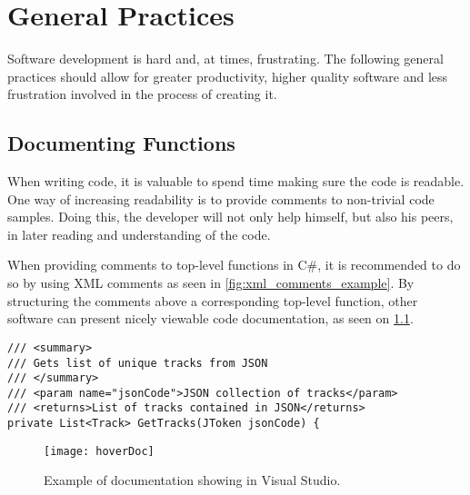 \chapter{General Practices}
\label{imp:general_practices}

Software development is hard and, at times, frustrating. The following
general practices should allow for greater productivity, higher
quality software and less frustration involved in the process of creating it.

\section{Documenting Functions}
When writing code, it is valuable to spend time making sure the
code is readable. One way of increasing readability is to provide comments
to non-trivial code samples. Doing this, the developer will not only
help himself, but also his peers, in later reading and understanding of the code.

When providing comments to top-level functions in C\#, it is
recommended to do so by using XML comments as seen in
\cref{fig:xml_comments_example}. By structuring the comments above a
corresponding top-level function, other software can present nicely
viewable code documentation, as seen on \cref{fig:hoverDoc}.

\begin{lstlisting}[caption = {Example of XML-comments on top of C\# function.}, label={fig:xml_comments_example}]
/// <summary>
/// Gets list of unique tracks from JSON
/// </summary>
/// <param name="jsonCode">JSON collection of tracks</param>
/// <returns>List of tracks contained in JSON</returns>
private List<Track> GetTracks(JToken jsonCode) {
\end{lstlisting}

\begin{figure}[hbtp]
  \centering
  \texttt{[image: hoverDoc]}
  \caption{Example of documentation showing in Visual Studio.}\label{fig:hoverDoc}
\end{figure}